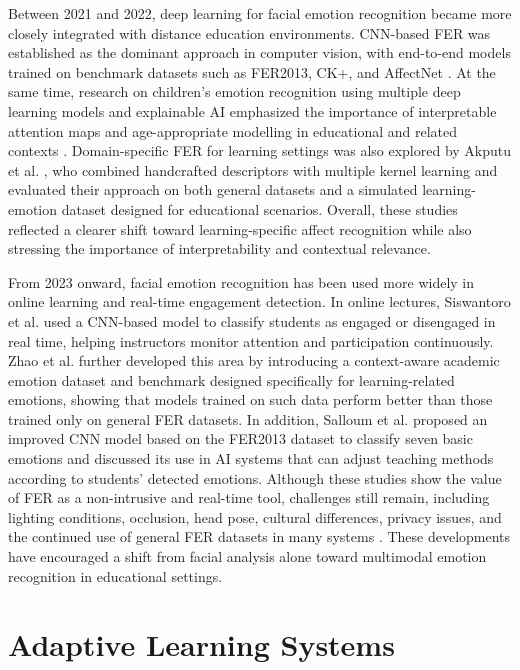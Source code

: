 Between 2021 and 2022, deep learning for facial emotion recognition became more closely integrated with distance education environments. CNN-based FER was established as the dominant approach in computer vision, with end-to-end models trained on benchmark datasets such as FER2013, CK+, and AffectNet \cite{liu2023application}. At the same time, research on children’s emotion recognition using multiple deep learning models and explainable AI emphasized the importance of interpretable attention maps and age-appropriate modelling in educational and related contexts \cite{rathod2022kids}. Domain-specific FER for learning settings was also explored by Akputu et al. \cite{akputu2022recognizing}, who combined handcrafted descriptors with multiple kernel learning and evaluated their approach on both general datasets and a simulated learning-emotion dataset designed for educational scenarios. Overall, these studies reflected a clearer shift toward learning-specific affect recognition while also stressing the importance of interpretability and contextual relevance.

From 2023 onward, facial emotion recognition has been used more widely in online learning and real-time engagement detection. In online lectures, Siswantoro et al. \cite{siswantoro2024facial} used a CNN-based model to classify students as engaged or disengaged in real time, helping instructors monitor attention and participation continuously. Zhao et al. \cite{zhao2025context} further developed this area by introducing a context-aware academic emotion dataset and benchmark designed specifically for learning-related emotions, showing that models trained on such data perform better than those trained only on general FER datasets. In addition, Salloum et al. \cite{salloum2025emotion} proposed an improved CNN model based on the FER2013 dataset to classify seven basic emotions and discussed its use in AI systems that can adjust teaching methods according to students’ detected emotions. Although these studies show the value of FER as a non-intrusive and real-time tool, challenges still remain, including lighting conditions, occlusion, head pose, cultural differences, privacy issues, and the continued use of general FER datasets in many systems \cite{anwar2023emotions,vistorte2024integrating}. These developments have encouraged a shift from facial analysis alone toward multimodal emotion recognition in educational settings.

\section{Adaptive Learning Systems}

